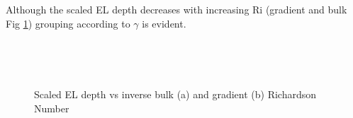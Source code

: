 
Although the scaled \acs{EL} depth decreases with increasing \acs{Ri} (gradient and bulk Fig \ref{fig:scaledeltahinvri})
grouping according to $\gamma$ is evident.\\

\begin{figure}[htbp]
\begin{minipage}[b]{0.5\linewidth}
        \\
        \end{minipage}             
\quad
\begin{minipage}[b]{0.5\linewidth}
        \\
       
       \end{minipage}
        \caption{Scaled EL depth vs inverse bulk (a)  and gradient (b) Richardson Number}
        \label{fig:scaledeltahinvri}
\end{figure}



\begin{figure}[htbp]
\begin{minipage}[b]{0.5\linewidth}
        \\
        \end{minipage}             
\quad
\begin{minipage}[b]{0.5\linewidth}
        \\
       
       \end{minipage}
        \caption{}
        \label{fig:}
\end{figure}



\endinput

Any text after an \endinput is ignored.
You could put scraps here or things in progress.
